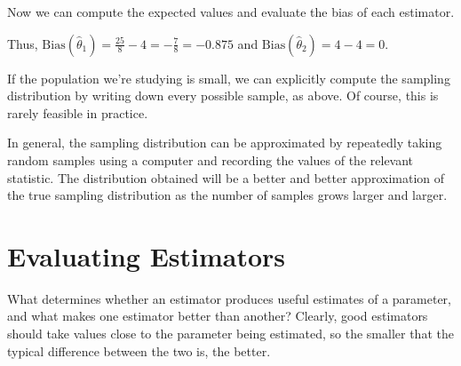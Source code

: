 \begin{examp}
\par
\noindent Now we can compute the expected values and evaluate the bias of each estimator.
\par
\noindent Thus, $\text{Bias}(\widehat{\theta}_1) = \frac{25}{8} - 4 = -\frac{7}{8} = -0.875$ and $\text{Bias}(\widehat{\theta}_2) = 4 - 4 = 0$.

\end{examp}
\par
\rmk If the population we're studying is small, we can explicitly compute the sampling distribution by writing down every possible sample, as above. Of course, this is rarely feasible in practice. 

In general, the sampling distribution can be approximated by repeatedly taking random samples using a computer and recording the values of the relevant statistic. The distribution obtained will be a better and better approximation of the true sampling distribution as the number of samples grows larger and larger.

\section{Evaluating Estimators}

What determines whether an estimator produces useful estimates of a parameter, and what makes one estimator better than another? Clearly, good estimators should take values close to the parameter being estimated, so the smaller that the typical difference between the two is, the better.


